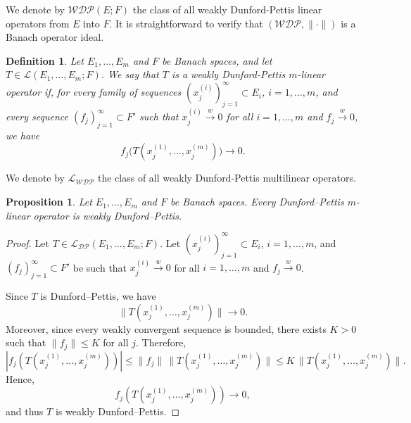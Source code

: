 \documentclass[12 pt]{article}%
\newtheorem{proposition}[theorem]{Proposition}
\newtheorem{final remark}[theorem]{Final Remark}
\newtheorem{definition}[theorem]{Definition}
\begin{document}
We denote by $\mathcal{WDP}(E;F)$ the class of all weakly Dunford-Pettis linear operators from $E$ into $F$. It is straightforward to verify that $(\mathcal{WDP},\|\cdot\|)$ is a Banach operator ideal.


\begin{definition}
	Let $E_1,\dots,E_m$ and $F$ be Banach spaces, and let $T \in \mathcal{L}(E_1,\dots,E_m;F)$. We say that $T$ is a weakly Dunford-Pettis $m$-linear operator if, for every family of sequences $(x_j^{(i)})_{j=1}^{\infty} \subset E_i$, $i=1,\dots,m$, and every sequence $(f_j)_{j=1}^{\infty} \subset F'$ such that $x_j^{(i)} \overset{w}{\to} 0$ for all $i=1,\dots,m$ and $f_j \overset{w}{\to} 0$, we have
	\begin{equation*}
		f_j\big(T(x_j^{(1)},\dots,x_j^{(m)})\big) \longrightarrow 0.
	\end{equation*}
\end{definition}

We denote by $\mathcal{L_{WDP}}$ the class of all weakly Dunford-Pettis multilinear operators.

\begin{proposition}\label{DPWDP}
	Let $E_1,\dots,E_m$ and $F$ be Banach spaces. Every Dunford--Pettis $m$-linear operator is weakly Dunford--Pettis.
\end{proposition}

\begin{proof}
	Let $T \in \mathcal{L_{DP}}(E_1,\dots,E_m;F)$. Let $(x_j^{(i)})_{j=1}^{\infty} \subset E_i$, $i=1,\dots,m$, and $(f_j)_{j=1}^{\infty} \subset F'$ be such that $x_j^{(i)} \overset{w}{\to} 0$ for all $i=1,\dots,m$ and $f_j \overset{w}{\to} 0$.
	
	Since $T$ is Dunford--Pettis, we have
	\begin{equation*}
		\|T(x_j^{(1)},\dots,x_j^{(m)})\| \longrightarrow 0.
	\end{equation*}
	Moreover, since every weakly convergent sequence is bounded, there exists $K>0$ such that $\|f_j\| \le K$ for all $j$. Therefore,
	\begin{equation*}
		|f_j(T(x_j^{(1)},\dots,x_j^{(m)}))|
		\le \|f_j\| \, \|T(x_j^{(1)},\dots,x_j^{(m)})\|
		\le K \, \|T(x_j^{(1)},\dots,x_j^{(m)})\|.
	\end{equation*}
	Hence,
	\begin{equation*}
		f_j(T(x_j^{(1)},\dots,x_j^{(m)})) \longrightarrow 0,
	\end{equation*}
	and thus $T$ is weakly Dunford--Pettis.
\end{proof}
\end{document}
